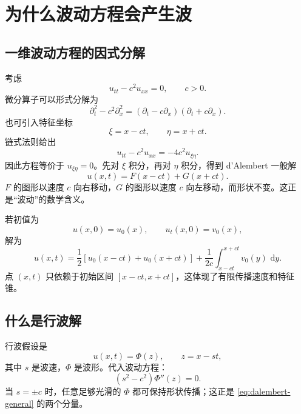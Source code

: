 \documentclass[cn,hazy,blue,11pt,normal]{elegantnote}
\numberwithin{equation}{section}
\newcommand{\dd}{\,\mathrm d}
\begin{document}
\section{为什么波动方程会产生波}

\subsection{一维波动方程的因式分解}

考虑
\begin{equation}
 u_{tt}-c^2u_{xx}=0,
 \qquad c>0. \label{eq:wave-1d}
\end{equation}
微分算子可以形式分解为
\begin{equation}
 \partial_t^2-c^2\partial_x^2
 =(\partial_t-c\partial_x)(\partial_t+c\partial_x).
\end{equation}
也可引入特征坐标
\begin{equation}
 \xi=x-ct,
 \qquad \eta=x+ct.
\end{equation}
链式法则给出
\begin{equation}
 u_{tt}-c^2u_{xx}=-4c^2u_{\xi\eta}.
\end{equation}
因此方程等价于 $u_{\xi\eta}=0$。先对 $\xi$ 积分，再对 $\eta$ 积分，得到 d'Alembert 一般解
\begin{equation}
 \boxed{u(x,t)=F(x-ct)+G(x+ct).} \label{eq:dalembert-general}
\end{equation}
$F$ 的图形以速度 $c$ 向右移动，$G$ 的图形以速度 $c$ 向左移动，而形状不变。这正是“波动”的数学含义。

若初值为
\begin{equation}
 u(x,0)=u_0(x),
 \qquad u_t(x,0)=v_0(x),
\end{equation}
解为
\begin{equation}
 \boxed{u(x,t)=\frac12[u_0(x-ct)+u_0(x+ct)]
 +\frac1{2c}\int_{x-ct}^{x+ct}v_0(y)\,\dd y.} \label{eq:dalembert}
\end{equation}
点 $(x,t)$ 只依赖于初始区间 $[x-ct,x+ct]$，这体现了有限传播速度和特征锥。

\subsection{什么是行波解}

行波假设是
\begin{equation}
 u(x,t)=\Phi(z),
 \qquad z=x-st,
\end{equation}
其中 $s$ 是波速，$\Phi$ 是波形。代入波动方程：
\begin{equation}
 (s^2-c^2)\Phi''(z)=0.
\end{equation}
当 $s=\pm c$ 时，任意足够光滑的 $\Phi$ 都可保持形状传播；这正是 \eqref{eq:dalembert-general} 的两个分量。
\end{document}
